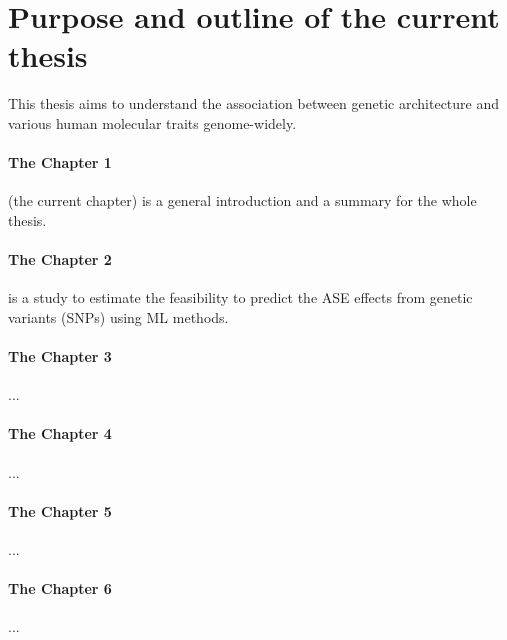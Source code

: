 \documentclass[12pt,usletter,fancy]{elegantbook}
\begin{document}
\begin{figure}[h]
\end{figure}

\section*{Purpose and outline of the current thesis}
This thesis aims to understand the association between genetic architecture and various human molecular traits genome-widely.
\paragraph*{The Chapter 1}(the current chapter) is a general introduction and a summary for the whole thesis.
\paragraph*{The Chapter 2} is a study to estimate the feasibility to predict the ASE effects from genetic variants (SNPs) using ML methods.
\paragraph*{The Chapter 3}...
\paragraph*{The Chapter 4}...
\paragraph*{The Chapter 5}...
\paragraph*{The Chapter 6}...
\end{document}
